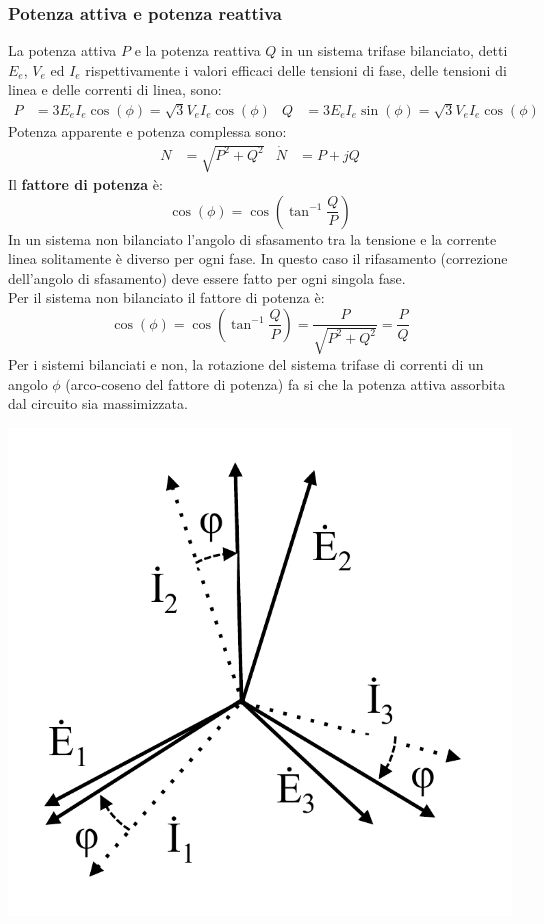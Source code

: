 \documentclass{article}
\begin{document}
\subsubsection{Potenza attiva e potenza reattiva}
La potenza attiva $P$ e la potenza reattiva $Q$ in un sistema trifase bilanciato,
detti $E_e$, $V_e$ ed $I_e$ rispettivamente i valori efficaci delle tensioni di fase, delle
tensioni di linea e delle correnti di linea, sono:
\begin{align*}
    P &= 3E_eI_e \cos(\phi) = \sqrt{3}V_eI_e \cos(\phi)
    &
    Q &= 3E_eI_e \sin(\phi) = \sqrt{3}V_eI_e \cos(\phi)
\end{align*}
Potenza apparente e potenza complessa sono:
\begin{align*}
    N &= \sqrt{P^2+Q^2} & \dot N &= P + jQ
\end{align*}
Il \textbf{fattore di potenza} è:
\[
    \cos(\phi) = \cos \left(\tan^{-1} \frac{Q}{P}\right)
\]
In un sistema non bilanciato l'angolo di sfasamento tra la tensione e la corrente linea solitamente è diverso per ogni fase. In questo caso il rifasamento (correzione dell'angolo di sfasamento) deve essere fatto per ogni singola fase.\\
Per il sistema non bilanciato il fattore di potenza è:
\[
    \cos(\phi) = \cos \left(\tan^{-1} \frac{Q}{P}\right) = \frac{P}{\sqrt{P^2+Q^2}} = \frac{P}{Q}
\]
Per i sistemi bilanciati e non, la rotazione del sistema trifase di correnti di un angolo $\phi$ (arco-coseno del fattore di potenza) fa si che la potenza attiva assorbita dal circuito sia massimizzata.
\begin{center}
    \includegraphics[scale=0.27]{Image/Potenza_sistemi_trifase_non_bilanciati_1.png}
\end{center}
\end{document}
